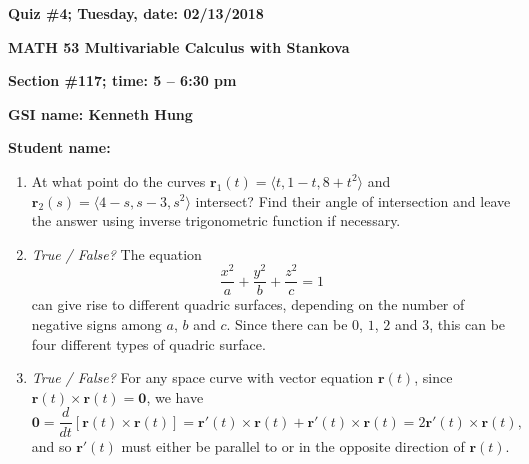 \documentclass{article}
\newcommand{\rr}{\mathbf{r}}
\begin{document}
{\bf Quiz \#4; Tuesday, date: 02/13/2018}

{\bf MATH 53 Multivariable Calculus with Stankova}

{\bf Section \#117; time: 5 -- 6:30 pm}

{\bf GSI name: Kenneth Hung}

{\bf Student name:}

\vspace*{0.25in}

\begin{enumerate}
\item At what point do the curves $\rr_1(t) = \langle t, 1 - t, 8 + t^2 \rangle$ and $\rr_2(s) = \langle 4 - s, s - 3, s^2 \rangle$ intersect? Find their angle of intersection and leave the answer using inverse trigonometric function if necessary.

\item {\em True / False?} The equation
\[
\frac{x^2}{a} + \frac{y^2}{b} + \frac{z^2}{c} = 1
\]
can give rise to different quadric surfaces, depending on the number of negative signs among $a$, $b$ and $c$. Since there can be $0$, $1$, $2$ and $3$, this can be four different types of quadric surface.

\item {\em True / False?} For any space curve with vector equation $\rr(t)$, since $\rr(t) \times \rr(t) = \mathbf{0}$, we have
\[
\mathbf{0} = \frac{d}{dt} [\rr(t) \times \rr(t)] = \rr'(t) \times \rr(t) + \rr'(t) \times \rr(t) = 2 \rr'(t) \times \rr(t),
\]
and so $\rr'(t)$ must either be parallel to or in the opposite direction of $\rr(t)$.
\end{enumerate}
\end{document}
